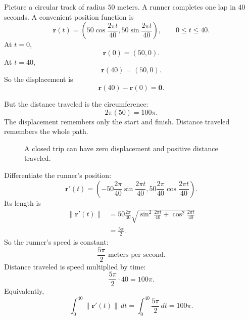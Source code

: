 Picture a circular track of radius \(50\) meters.  A runner completes one lap in
\(40\) seconds.  A convenient position function is
\[
    \mathbf r(t)=
    \left(
        50\cos\frac{2\pi t}{40},
        50\sin\frac{2\pi t}{40}
    \right),
    \qquad 0\le t\le 40.
\]
At \(t=0\),
\[
    \mathbf r(0)=(50,0).
\]
At \(t=40\),
\[
    \mathbf r(40)=(50,0).
\]
So the displacement is
\[
    \mathbf r(40)-\mathbf r(0)=\mathbf 0.
\]

But the distance traveled is the circumference:
\[
    2\pi(50)=100\pi.
\]
The displacement remembers only the start and finish.  Distance traveled remembers the
whole path.

\begin{figure}[h]
\centering
{}
\caption{A closed trip can have zero displacement and positive distance traveled.}
\end{figure}

Differentiate the runner's position:
\[
    \mathbf r'(t)
    =
    \left(
        -50\frac{2\pi}{40}\sin\frac{2\pi t}{40},
        50\frac{2\pi}{40}\cos\frac{2\pi t}{40}
    \right).
\]
Its length is
\[
\begin{aligned}
    \|\mathbf r'(t)\|
    &=
    50\frac{2\pi}{40}
    \sqrt{
        \sin^2\frac{2\pi t}{40}
        +
        \cos^2\frac{2\pi t}{40}
    }\\
    &=
    \frac{5\pi}{2}.
\end{aligned}
\]
So the runner's speed is constant:
\[
    \frac{5\pi}{2}\text{ meters per second}.
\]
Distance traveled is speed multiplied by time:
\[
    \frac{5\pi}{2}\cdot 40=100\pi.
\]
Equivalently,
\[
    \int_0^{40}\|\mathbf r'(t)\|\,dt
    =
    \int_0^{40}\frac{5\pi}{2}\,dt
    =
    100\pi.
\]

